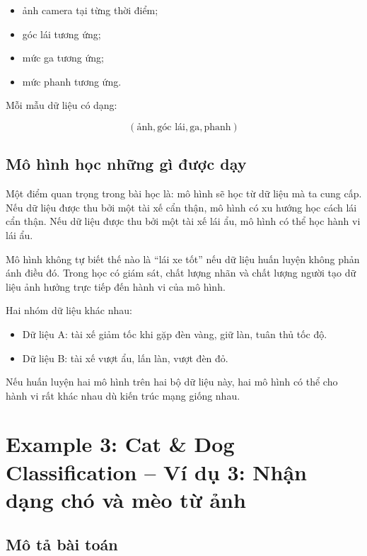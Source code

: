 \begin{itemize}
    \item ảnh camera tại từng thời điểm;
    \item góc lái tương ứng;
    \item mức ga tương ứng;
    \item mức phanh tương ứng.
\end{itemize}

Mỗi mẫu dữ liệu có dạng:

\[
    (\text{ảnh}, \text{góc lái}, \text{ga}, \text{phanh})
\]

\subsection{Mô hình học những gì được dạy}

Một điểm quan trọng trong bài học là: mô hình sẽ học từ dữ liệu mà ta cung cấp. Nếu dữ liệu được thu bởi một tài xế cẩn thận, mô hình có xu hướng học cách lái cẩn thận. Nếu dữ liệu được thu bởi một tài xế lái ẩu, mô hình có thể học hành vi lái ẩu.

\begin{canhbao}
Mô hình không tự biết thế nào là ``lái xe tốt'' nếu dữ liệu huấn luyện không phản ánh điều đó. Trong học có giám sát, chất lượng nhãn và chất lượng người tạo dữ liệu ảnh hưởng trực tiếp đến hành vi của mô hình.
\end{canhbao}

\begin{vidu}
Hai nhóm dữ liệu khác nhau:

\begin{itemize}
    \item Dữ liệu A: tài xế giảm tốc khi gặp đèn vàng, giữ làn, tuân thủ tốc độ.
    \item Dữ liệu B: tài xế vượt ẩu, lấn làn, vượt đèn đỏ.
\end{itemize}

Nếu huấn luyện hai mô hình trên hai bộ dữ liệu này, hai mô hình có thể cho hành vi rất khác nhau dù kiến trúc mạng giống nhau.
\end{vidu}

\section{Example 3: Cat \& Dog Classification -- Ví dụ 3: Nhận dạng chó và mèo từ ảnh}

\subsection{Mô tả bài toán}

